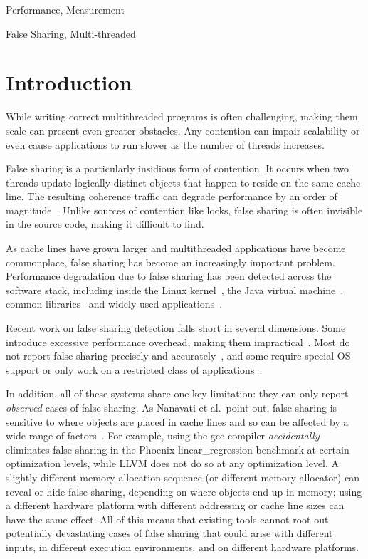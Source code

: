 \documentclass[10pt]{sigplanconf}
\begin{document}

\terms
Performance, Measurement

\keywords
False Sharing, Multi-threaded

\section{Introduction}
\label{sec:intro} 

While writing correct multithreaded programs is often challenging,
making them scale can present even greater obstacles. Any contention can impair scalability or even cause
applications to run slower as the number of threads increases.

False sharing is a particularly insidious form of contention.
It occurs when two threads update logically-distinct objects that happen to reside on the same cache line. The resulting
coherence traffic can degrade performance by an order of
magnitude~\cite{falseshareeffect}. Unlike sources of contention like locks, false sharing is often invisible in the source code, making it difficult to find.

As cache lines have grown larger and multithreaded applications have
become commonplace, false sharing has become an increasingly important
problem. Performance degradation due to false sharing has been detected across the software stack,
including inside the Linux kernel~\cite{OSfalsesharing}, the Java
virtual machine~\cite{JVMfalsesharing}, common
libraries~\cite{libfalsesharing} and widely-used
applications~\cite{mysql,appfalsesharing}.

Recent work on false sharing detection falls short in several dimensions. Some introduce excessive performance overhead, making them impractical~\cite{falseshare:binaryinstrumentation1,falseshare:binaryinstrumentation2,falseshare:simulator}. Most do not report false sharing precisely and accurately~\cite{falseshare:binaryinstrumentation1,detect:ptu,detect:intel,falseshare:binaryinstrumentation2,DProf,qinzhaodetection}, and some require special OS support or only work on a restricted class of applications~\cite{OSdetection,sheriff}.

In addition, all of these systems share one key limitation: they can
only report \emph{observed} cases of false sharing. As Nanavati et al.\ point out, false sharing is sensitive to where objects are placed in cache lines and so can be affected by a wide range of factors~\cite{OSdetection}. For example, using the gcc compiler \emph{accidentally} eliminates false sharing in the Phoenix linear\_regression benchmark at certain optimization levels, while LLVM does not do so at any optimization level.  A slightly different memory allocation sequence (or different memory allocator) can reveal or hide
false sharing, depending on where objects end up in memory; using a different hardware platform with different addressing or cache line sizes can have the same effect. All of this means that existing tools cannot root out potentially devastating cases of false sharing that could arise with different inputs, in different execution environments, and on different hardware platforms.
\end{document}

